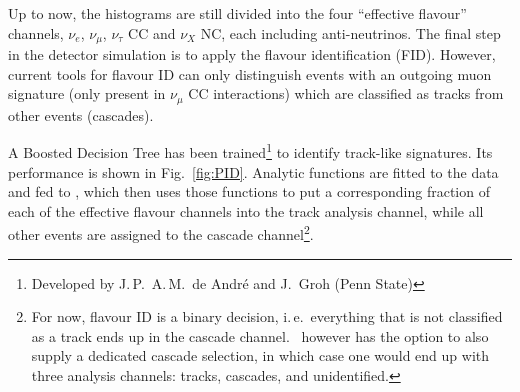 
Up to now, the histograms are still divided into the four ``effective flavour''
channels, $\nu_e$, $\nu_\mu$, $\nu_\tau$ CC and $\nu_X$ NC, each including
anti-neutrinos. The final step in the detector simulation is to apply the
flavour identification (FID). However, current tools for flavour ID can only
distinguish events with an outgoing muon signature (only present in $\nu_\mu$ CC
interactions) which are classified as tracks from other events (cascades).

A Boosted Decision Tree has been trained\footnote{Developed by J.\,P.\ A.\,M.\
de Andr\'{e} and J.\ Groh (Penn State)} to identify track-like signatures. Its
performance is shown in Fig.~\ref{fig:PID}. Analytic functions are fitted to the
data and fed to \papa, which then uses those functions to put a corresponding
fraction of each of the effective flavour channels into the track analysis
channel, while all other events are assigned to the cascade channel\footnote{For
now, flavour ID is a binary decision, i.\,e.\ everything that is not classified
as a track ends up in the cascade channel. \papa\ however has the option to also
supply a dedicated cascade selection, in which case one would end up with three
analysis channels: tracks, cascades, and unidentified.}.

